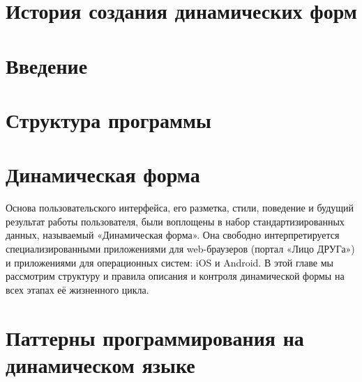 \documentclass[13pt]{extbook}
\begin{document}
		
 	\pagestyle{empty} 
    
    \mainmatter
    \tableofcontents
	
	\pagestyle{fancy} 
	\fancyhead[RE]{\leftmark}
	\fancyhead[LE]{\thepage}
	\fancyhead[LO]{\rightmark}
	\fancyhead[RO]{\thepage}
	\fancyfoot[]{}

	\setcounter{secnumdepth}{0}
	
    \chapter{История создания динамических форм}
    
    
    \setcounter{secnumdepth}{1}
    
	\chapter{Введение}
    
   	
	\chapter{Структура программы}
    

	\chapter{Динамическая форма}\label{sec:dynfom}
	Основа пользовательского интерфейса, его разметка, стили, поведение и будущий результат работы пользователя,
	были воплощены в набор стандартизированных данных, называемый «Динамическая форма». Она свободно интерпретируется
	специализированными приложениями для web-браузеров (портал «Лицо ДРУГа») и приложениями для операционных систем:
	iOS и Android. В этой главе мы рассмотрим структуру и правила описания и контроля динамической формы
	на всех этапах её жизненного цикла.
	
    
    
    

	\chapter{Паттерны программирования на динамическом языке}
    
    
\end{document}
